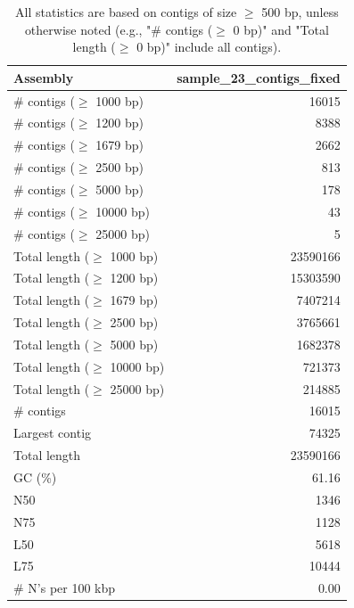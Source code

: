 \documentclass[12pt,a4paper]{article}
\begin{document}
\begin{table}[ht]
\begin{center}
\caption{All statistics are based on contigs of size $\geq$ 500 bp, unless otherwise noted (e.g., "\# contigs ($\geq$ 0 bp)" and "Total length ($\geq$ 0 bp)" include all contigs).}
\begin{tabular}{|l*{1}{|r}|}
\hline
Assembly & sample\_23\_contigs\_fixed \\ \hline
\# contigs ($\geq$ 1000 bp) & 16015 \\ \hline
\# contigs ($\geq$ 1200 bp) & 8388 \\ \hline
\# contigs ($\geq$ 1679 bp) & 2662 \\ \hline
\# contigs ($\geq$ 2500 bp) & 813 \\ \hline
\# contigs ($\geq$ 5000 bp) & 178 \\ \hline
\# contigs ($\geq$ 10000 bp) & 43 \\ \hline
\# contigs ($\geq$ 25000 bp) & 5 \\ \hline
Total length ($\geq$ 1000 bp) & 23590166 \\ \hline
Total length ($\geq$ 1200 bp) & 15303590 \\ \hline
Total length ($\geq$ 1679 bp) & 7407214 \\ \hline
Total length ($\geq$ 2500 bp) & 3765661 \\ \hline
Total length ($\geq$ 5000 bp) & 1682378 \\ \hline
Total length ($\geq$ 10000 bp) & 721373 \\ \hline
Total length ($\geq$ 25000 bp) & 214885 \\ \hline
\# contigs & 16015 \\ \hline
Largest contig & 74325 \\ \hline
Total length & 23590166 \\ \hline
GC (\%) & 61.16 \\ \hline
N50 & 1346 \\ \hline
N75 & 1128 \\ \hline
L50 & 5618 \\ \hline
L75 & 10444 \\ \hline
\# N's per 100 kbp & 0.00 \\ \hline
\end{tabular}
\end{center}
\end{table}
\end{document}
